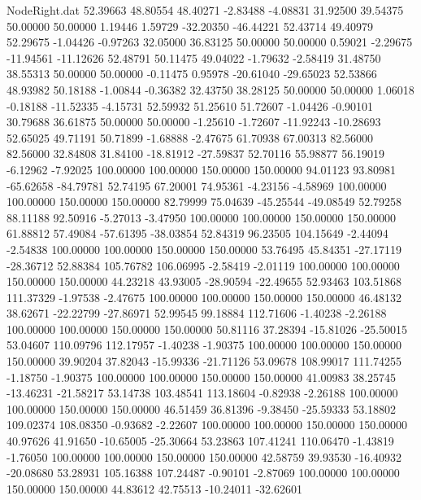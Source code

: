 \begin{filecontents}{NodeRight.dat}
  52.39663   48.80554   48.40271    -2.83488   -4.08831   31.92500   39.54375   50.00000   50.00000    1.19446    1.59729  -32.20350  -46.44221
  52.43714   49.40979   52.29675    -1.04426   -0.97263   32.05000   36.83125   50.00000   50.00000    0.59021   -2.29675  -11.94561  -11.12626
  52.48791   50.11475   49.04022    -1.79632   -2.58419   31.48750   38.55313   50.00000   50.00000   -0.11475    0.95978  -20.61040  -29.65023
  52.53866   48.93982   50.18188    -1.00844   -0.36382   32.43750   38.28125   50.00000   50.00000    1.06018   -0.18188  -11.52335   -4.15731
  52.59932   51.25610   51.72607    -1.04426   -0.90101   30.79688   36.61875   50.00000   50.00000   -1.25610   -1.72607  -11.92243  -10.28693
  52.65025   49.71191   50.71899    -1.68888   -2.47675   61.70938   67.00313   82.56000   82.56000   32.84808   31.84100  -18.81912  -27.59837
  52.70116   55.98877   56.19019    -6.12962   -7.92025  100.00000  100.00000  150.00000  150.00000   94.01123   93.80981  -65.62658  -84.79781
  52.74195   67.20001   74.95361    -4.23156   -4.58969  100.00000  100.00000  150.00000  150.00000   82.79999   75.04639  -45.25544  -49.08549
  52.79258   88.11188   92.50916    -5.27013   -3.47950  100.00000  100.00000  150.00000  150.00000   61.88812   57.49084  -57.61395  -38.03854
  52.84319   96.23505  104.15649    -2.44094   -2.54838  100.00000  100.00000  150.00000  150.00000   53.76495   45.84351  -27.17119  -28.36712
  52.88384  105.76782  106.06995    -2.58419   -2.01119  100.00000  100.00000  150.00000  150.00000   44.23218   43.93005  -28.90594  -22.49655
  52.93463  103.51868  111.37329    -1.97538   -2.47675  100.00000  100.00000  150.00000  150.00000   46.48132   38.62671  -22.22799  -27.86971
  52.99545   99.18884  112.71606    -1.40238   -2.26188  100.00000  100.00000  150.00000  150.00000   50.81116   37.28394  -15.81026  -25.50015
  53.04607  110.09796  112.17957    -1.40238   -1.90375  100.00000  100.00000  150.00000  150.00000   39.90204   37.82043  -15.99336  -21.71126
  53.09678  108.99017  111.74255    -1.18750   -1.90375  100.00000  100.00000  150.00000  150.00000   41.00983   38.25745  -13.46231  -21.58217
  53.14738  103.48541  113.18604    -0.82938   -2.26188  100.00000  100.00000  150.00000  150.00000   46.51459   36.81396   -9.38450  -25.59333
  53.18802  109.02374  108.08350    -0.93682   -2.22607  100.00000  100.00000  150.00000  150.00000   40.97626   41.91650  -10.65005  -25.30664
  53.23863  107.41241  110.06470    -1.43819   -1.76050  100.00000  100.00000  150.00000  150.00000   42.58759   39.93530  -16.40932  -20.08680
  53.28931  105.16388  107.24487    -0.90101   -2.87069  100.00000  100.00000  150.00000  150.00000   44.83612   42.75513  -10.24011  -32.62601

\end{filecontents}
